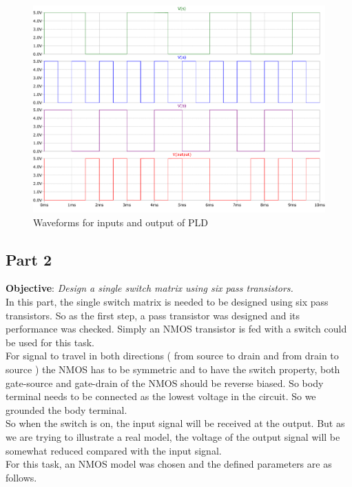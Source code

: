 \documentclass[a4paper,11pt]{article}%
\begin{document}
\begin{figure}[H]
	\centering
	\includegraphics[scale=0.5]{figures/2part1/wave.pdf}
	\caption{Waveforms for inputs and output of PLD }
\end{figure}

\pagebreak
\subsection{Part 2}
\textbf{Objective}: \textit{Design a single switch matrix using six pass transistors.}\\

In this part, the single switch matrix is needed to be designed using six pass transistors. So as the first step, a pass transistor was designed and its performance was checked. Simply an NMOS transistor is fed with a switch could be used for this task.\\

For signal to travel in both directions ( from source to drain and from drain to source ) the NMOS has to be symmetric and to have the switch property, both gate-source and gate-drain of the NMOS should be reverse biased. So body terminal needs to be connected as the lowest voltage in the circuit. So we grounded the body terminal.\\

So when the switch is on, the input signal will be received at the output. But as we are trying to illustrate a real model, the voltage of the output signal will be somewhat reduced compared with the input signal.\\

For this task, an NMOS model was chosen and the defined parameters are as follows\cite{data}.
\end{document}
